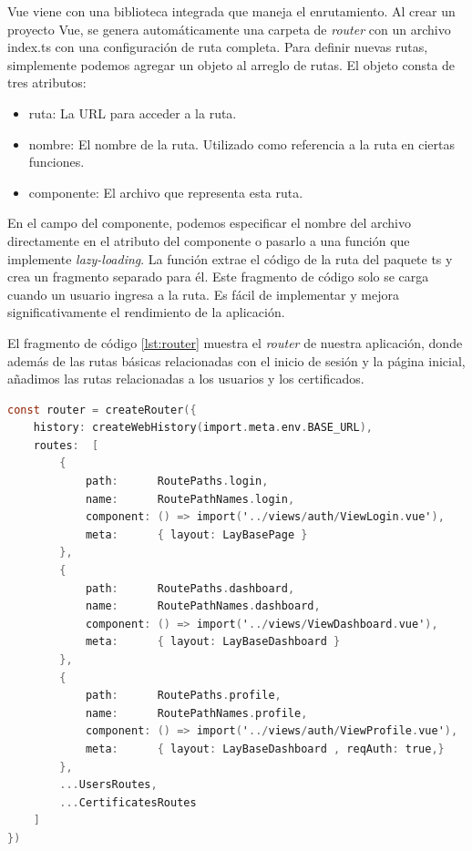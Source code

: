 Vue viene con una biblioteca integrada que maneja el enrutamiento. Al crear un proyecto Vue, se genera automáticamente una carpeta de \textit{router} con un archivo index.ts con una configuración de ruta completa. Para definir nuevas rutas, simplemente podemos agregar un objeto al arreglo de rutas. El objeto consta de tres atributos:

\begin{itemize}
\item ruta: La URL para acceder a la ruta.
\item nombre: El nombre de la ruta. Utilizado como referencia a la ruta en ciertas funciones.
\item componente: El archivo que representa esta ruta.
\end{itemize}

En el campo del componente, podemos especificar el nombre del archivo directamente en el atributo del componente o pasarlo a una función que implemente \textit{lazy-loading}. La función extrae el código de la ruta del paquete ts y crea un fragmento separado para él. Este fragmento de código solo se carga cuando un usuario ingresa a la ruta. Es fácil de implementar y mejora significativamente el rendimiento de la aplicación.

El fragmento de código \ref{lst:router} muestra el \textit{router} de nuestra aplicación, donde además de las rutas básicas relacionadas con el inicio de sesión y la página inicial, añadimos las rutas relacionadas a los usuarios y los certificados. 

\begin{lstlisting}[language=C,caption={Configuración de las rutas}, label={lst:router}]
const router = createRouter({
    history: createWebHistory(import.meta.env.BASE_URL),
    routes:  [
        {
            path:      RoutePaths.login,
            name:      RoutePathNames.login,
            component: () => import('../views/auth/ViewLogin.vue'),
            meta:      { layout: LayBasePage }
        },
        {
            path:      RoutePaths.dashboard,
            name:      RoutePathNames.dashboard,
            component: () => import('../views/ViewDashboard.vue'),
            meta:      { layout: LayBaseDashboard }
        },
        {
            path:      RoutePaths.profile,
            name:      RoutePathNames.profile,
            component: () => import('../views/auth/ViewProfile.vue'),
            meta:      { layout: LayBaseDashboard , reqAuth: true,}
        },
        ...UsersRoutes,
        ...CertificatesRoutes
    ]
})
\end{lstlisting}


